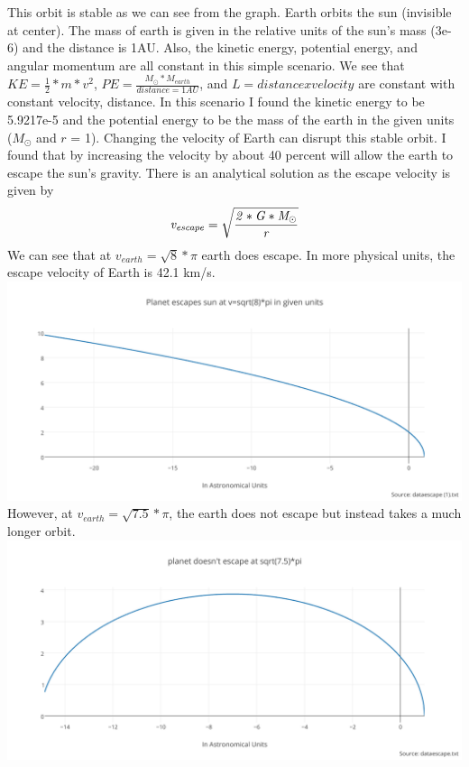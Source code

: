 \documentclass[11pt,a4wide]{article}
\begin{document}
\begin{enumerate}
This orbit is stable as we can see from the graph. Earth orbits the sun (invisible at center). The mass of earth is given in the relative units of the sun's mass (3e-6) and the distance is 1AU. Also, the kinetic energy, potential energy, and angular momentum are all constant in this simple scenario. We see that $KE=\frac{1}{2}*m*v^{2}$, $PE=\frac{M_{\odot}*M_{earth}}{distance=1AU}$, and $L=distance x velocity$ are constant with constant velocity, distance. In this scenario I found the kinetic energy to be 5.9217e-5 and the potential energy to be the mass of the earth in the given units ($M_{\odot}$ and $r$ = 1). 
Changing the velocity of Earth can disrupt this stable orbit. I found that by increasing the velocity by about 40 percent will allow the earth to escape the sun's gravity. There is an analytical solution as the escape velocity is given by
\[
\it v_{escape}=\sqrt{\frac{2*G*M_{\odot}}{r}}
\] We can see that at $v_{earth} = \sqrt{8}*\pi$ earth does escape. In more physical units, the escape velocity of Earth is 42.1 km/s. 
\centering
\includegraphics[width=6in]{planet_escapes_sun_at_vsqrt8pi_in_given_units.png}\\
However, at $v_{earth} = \sqrt{7.5}*\pi$, the earth does not escape but instead takes a much longer orbit. 
\includegraphics[width=6in]{planet_doesnt_escape_at_sqrt75pi.png}\\


\end{enumerate}
\end{document}
